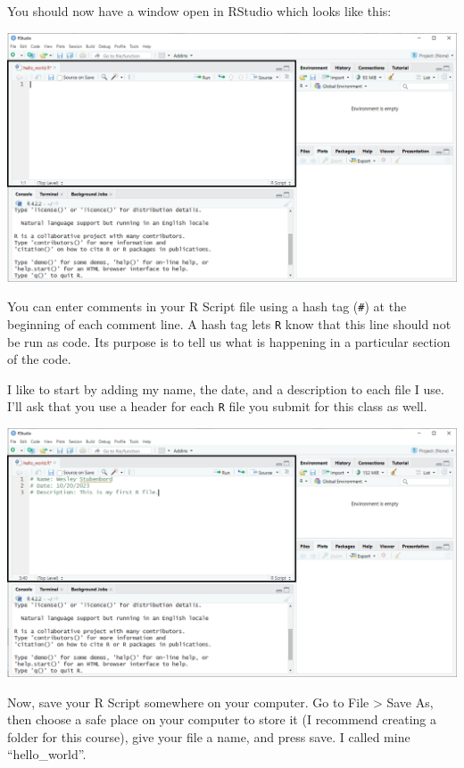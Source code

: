 \documentclass[
]{book}
\begin{document}
You should now have a window open in RStudio which looks like this:

\includegraphics{docs/_main_files/figure-html/RStudio_Opened RScript.png}

You can enter comments in your R Script file using a hash tag (\texttt{\#}) at the beginning of each comment line. A hash tag lets \texttt{R} know that this line should not be run as code. Its purpose is to tell us what is happening in a particular section of the code.

I like to start by adding my name, the date, and a description to each file I use. I'll ask that you use a header for each \texttt{R} file you submit for this class as well.

\includegraphics{docs/_main_files/figure-html/RStudio_Commenting in an R Script file.png}

Now, save your R Script somewhere on your computer. Go to File \textgreater{} Save As, then choose a safe place on your computer to store it (I recommend creating a folder for this course), give your file a name, and press save. I called mine ``hello\_world''.
\end{document}
